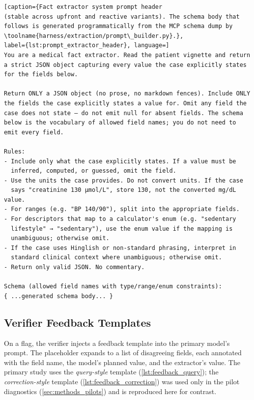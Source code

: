 \begin{lstlisting}[caption={Fact extractor system prompt header
(stable across upfront and reactive variants). The schema body that
follows is generated programmatically from the MCP schema dump by
\toolname{harness/extraction/prompt\_builder.py}.},
label={lst:prompt_extractor_header}, language=]
You are a medical fact extractor. Read the patient vignette and return
a strict JSON object capturing every value the case explicitly states
for the fields below.

Return ONLY a JSON object (no prose, no markdown fences). Include ONLY
the fields the case explicitly states a value for. Omit any field the
case does not state — do not emit null for absent fields. The schema
below is the vocabulary of allowed field names; you do not need to
emit every field.

Rules:
- Include only what the case explicitly states. If a value must be
  inferred, computed, or guessed, omit the field.
- Use the units the case provides. Do not convert units. If the case
  says "creatinine 130 µmol/L", store 130, not the converted mg/dL value.
- For ranges (e.g. "BP 140/90"), split into the appropriate fields.
- For descriptors that map to a calculator's enum (e.g. "sedentary
  lifestyle" → "sedentary"), use the enum value if the mapping is
  unambiguous; otherwise omit.
- If the case uses Hinglish or non-standard phrasing, interpret in
  standard clinical context where unambiguous; otherwise omit.
- Return only valid JSON. No commentary.

Schema (allowed field names with type/range/enum constraints):
{ ...generated schema body... }
\end{lstlisting}

\subsection{Verifier Feedback Templates}
\label{app:feedback_template}

On a flag, the verifier injects a feedback template into the primary
model's prompt. The  placeholder expands to a
list of disagreeing fields, each annotated with the field name, the
model's planned value, and the extractor's value. The primary study
uses the \emph{query-style} template
(\cref{lst:feedback_query}); the \emph{correction-style} template
(\cref{lst:feedback_correction}) was used only in the pilot
diagnostics (\cref{sec:methods_pilots}) and is reproduced here for
contrast.

